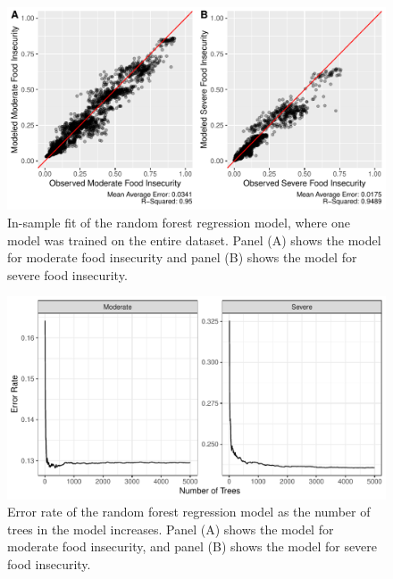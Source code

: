 \documentclass{article}
\begin{document}
\begin{figure}[H]
  \centering
  \includegraphics[width=\linewidth]{img/in-sample_rf.pdf}
  \caption{In-sample fit of the random forest regression model, where one model was trained on the entire dataset. Panel (A) shows the model for moderate food insecurity and panel (B) shows the model for severe food insecurity.}
  \label{fig:rf_in-sample}
\end{figure}

\begin{figure}[H]
  \centering
  \includegraphics[width=\linewidth]{img/Error_Over_Training.pdf}
  \caption{Error rate of the random forest regression model as the number of trees in the model increases. Panel (A) shows the model for moderate food insecurity, and panel (B) shows the model for severe food insecurity.}
  \label{fig:mod-error}
\end{figure}

\printbibliography
\end{document}
